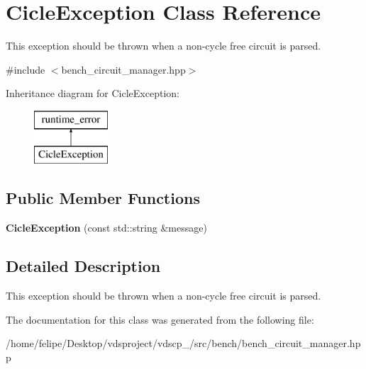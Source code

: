 \section{Cicle\+Exception Class Reference}
\label{classCicleException}


This exception should be thrown when a non-\/cycle free circuit is parsed.  




{\ttfamily \#include $<$bench\+\_\+circuit\+\_\+manager.\+hpp$>$}

Inheritance diagram for Cicle\+Exception\+:\begin{figure}[H]
\begin{center}
\leavevmode
\includegraphics[height=2.000000cm]{classCicleException}
\end{center}
\end{figure}
\subsection*{Public Member Functions}
\begin{DoxyCompactItemize}
\item 
{\bfseries Cicle\+Exception} (const std\+::string \&message)\label{classCicleException_a51147b615bdb26f9301f0a79bba60c28}

\end{DoxyCompactItemize}


\subsection{Detailed Description}
This exception should be thrown when a non-\/cycle free circuit is parsed. 

The documentation for this class was generated from the following file\+:\begin{DoxyCompactItemize}
\item 
/home/felipe/\+Desktop/vdsproject/vdscp\+\_/src/bench/bench\+\_\+circuit\+\_\+manager.\+hpp\end{DoxyCompactItemize}
